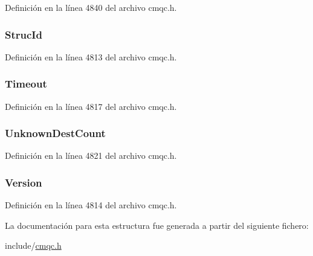Definición en la línea 4840 del archivo cmqc.\+h.

\hypertarget{structtag_m_q_p_m_o_a0530922ca944569b52601d74941f96e4}{}
\subsubsection[{Struc\+Id}]{ Struc\+Id}\label{structtag_m_q_p_m_o_a0530922ca944569b52601d74941f96e4}


Definición en la línea 4813 del archivo cmqc.\+h.

\hypertarget{structtag_m_q_p_m_o_a9a46af4b5b34638a690924bb9709c5ba}{}
\subsubsection[{Timeout}]{ Timeout}\label{structtag_m_q_p_m_o_a9a46af4b5b34638a690924bb9709c5ba}


Definición en la línea 4817 del archivo cmqc.\+h.

\hypertarget{structtag_m_q_p_m_o_a6443c93f9930aa26f661e00e631a32ea}{}
\subsubsection[{Unknown\+Dest\+Count}]{ Unknown\+Dest\+Count}\label{structtag_m_q_p_m_o_a6443c93f9930aa26f661e00e631a32ea}


Definición en la línea 4821 del archivo cmqc.\+h.

\hypertarget{structtag_m_q_p_m_o_a0656ef8f766b3907d394d88a35d7b7e9}{}
\subsubsection[{Version}]{ Version}\label{structtag_m_q_p_m_o_a0656ef8f766b3907d394d88a35d7b7e9}


Definición en la línea 4814 del archivo cmqc.\+h.



La documentación para esta estructura fue generada a partir del siguiente fichero\+:\begin{DoxyCompactItemize}
\item 
include/\hyperlink{cmqc_8h}{cmqc.\+h}\end{DoxyCompactItemize}

